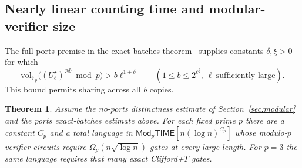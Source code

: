 \documentclass[11pt]{article}
\newtheorem{theorem}{Theorem}[section]
\theoremstyle{definition}
\theoremstyle{remark}
\newcommand{\vol}{\mathrm{vol}}
\newcommand{\F}{\mathbb{F}}
\begin{document}
\subsection{Nearly linear counting time and modular-verifier size}
The full ports premise in the exact-batches theorem~\cite{HC} supplies
constants $\delta,\xi>0$ for which
\[
 \vol_{\F_p}\bigl((U_\ell^\star)^{\otimes b}\bmod p\bigr)
     > b\ell^{1+\delta}
 \qquad (1\le b\le 2^{\ell^\xi},\ \ell\ \text{sufficiently large}).
\]
This bound permits sharing across all $b$ copies.

\begin{theorem}\label{thm:nearly-linear-count}
Assume the no-ports distinctness estimate of Section~\ref{sec:modular}
and the ports exact-batches estimate above. For each fixed prime $p$
there are a constant $C_p$ and a total language in
$\mathsf{Mod}_p\mathsf{TIME}[n(\log n)^{C_p}]$ whose modulo-$p$ verifier
circuits require $\Omega_p(n\sqrt{\log n})$ gates at every large length.
For $p=3$ the same language requires that many exact Clifford+$T$ gates.
\end{theorem}
\end{document}
